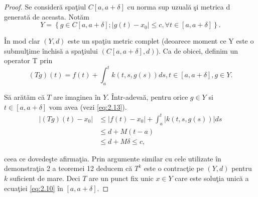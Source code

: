 \documentclass[a4paper,12pt,oneside]{report}
\begin{document}
\begin{proof}

Se consider\u{a} spa\c{t}iul \(C \left [ a, a + \delta  \right ]\) cu norma sup uzual\u{a} \c{s}i metrica d generat\u{a} de aceasta. Not\u{a}m
\begin{displaymath}
Y = \left \{ g\in C \left [ a,a+\delta  \right ] ; \left | g\left ( t \right ) - x_{0}\right | \leq c, \forall t \in \left [ a, a+\delta  \right ]\right \}.
\end{displaymath}

\noindent \^{I}n mod clar \(\left ( Y,d \right )\) este un spa\c{t}iu metric complet (deoarece moment ce Y este o submul\c{t}ime \^{i}nchis\u{a} a spa\c{t}iului \(\left ( C \left [ a, a + \delta  \right ] , d \right )\)). Ca de obicei, definim un operator T prin
\begin{displaymath}
\left ( Tg \right )\left ( t \right ) = f\left ( t \right ) + \int_{a}^{t}k\left ( t,s,g\left ( s \right ) \right )ds, t\in \left [ a, a + \delta  \right ], g\in Y.
\end{displaymath}
					
\noindent S\u{a} ar\u{a}t\u{a}m c\u{a}  \(T\) are imaginea \^{i}n \(Y\). \^{I}ntr-adeva\u{a}, pentru orice \(g\in Y\) si \(t\in \left [ a, a+ \delta  \right ]\) vom avea (vezi \ref{eq:2.13}).
\begin{equation} \nonumber
    \begin{split}
      \left | \left ( Tg \right )\left ( t \right ) - x_{0}\right | &   \leq \left | f\left ( t \right )-x_{0} \right | + \int_{a}^{t}\left | k\left ( t,s,g\left ( s \right ) \right ) \right |ds \\ & \leq d + M\left ( t-a \right ) \\ & \leq  d+ M\delta  \leq  c,
    \end{split}
\end{equation}

\noindent ceea ce dovede\c{s}te afirma\c{t}ia. Prin argumente similar cu cele utilizate \^{i}n demonstra\c{t}ia 2 a teoremei 12 deducem c\u{a} \(T^{k}\) este o contrac\c{t}ie pe \(\left ( Y,d \right )\) pentru \(k\) suficient de mare. Deci \(T\) are un punct fix unic \(x \in Y\) care este solu\c{t}ia unic\u{a} a ecua\c{t}iei \ref{eq:2.10} \^{i}n \(\left [ a, a + \delta  \right ]\).
\end{proof}
\end{document}
